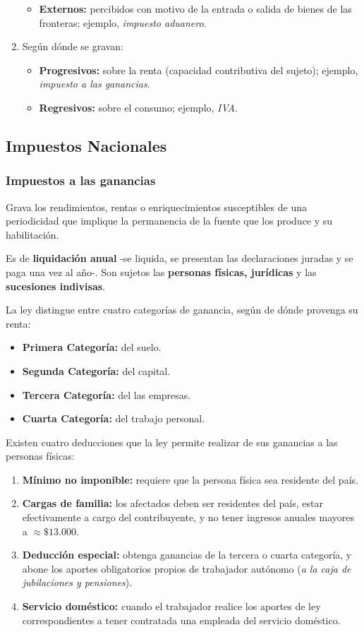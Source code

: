 \documentclass[10pt,a4paper]{article}
\begin{document}
\begin{enumerate}
\begin{itemize}
\item \textbf{Externos:} percibidos con motivo de la entrada o salida de bienes de las fronteras; ejemplo, \textit{impuesto aduanero}.
\end{itemize}
\item Según dónde se gravan:
\begin{itemize}
\item \textbf{Progresivos:} sobre la renta (capacidad contributiva del sujeto); ejemplo, \textit{impuesto a las ganancias}.
\item \textbf{Regresivos:} sobre el consumo; ejemplo, \textit{IVA}.
\end{itemize}
\end{enumerate}

\subsection{Impuestos Nacionales}

\subsubsection{Impuestos a las ganancias}

Grava los rendimientos, rentas o enriquecimientos susceptibles de una periodicidad que implique la permanencia de la fuente que los produce y su habilitación.

Es de \textbf{liquidación anual} -se liquida, se presentan las declaraciones juradas y se paga una vez al año-. Son sujetos las \textbf{personas físicas, jurídicas} y las \textbf{sucesiones indivisas}.

La ley distingue entre cuatro categorías de ganancia, según de dónde provenga su renta:
\begin{itemize}
\item \textbf{Primera Categoría:} del suelo.
\item \textbf{Segunda Categoría:} del capital.
\item \textbf{Tercera Categoría:} del las empresas.
\item \textbf{Cuarta Categoría:} del trabajo personal.
\end{itemize}

Existen cuatro deducciones que la ley permite realizar de sus ganancias a las personas físicas:
\begin{enumerate}
\item \textbf{Mínimo no imponible:} requiere que la persona física sea residente del país.
\item \textbf{Cargas de familia:} los afectados deben ser residentes del país, estar efectivamente a cargo del contribuyente, y no tener ingresos anuales mayores a $\approx \$13.000$.
\item \textbf{Deducción especial:} obtenga ganancias de la tercera o cuarta categoría, y abone los aportes obligatorios propios de trabajador autónomo (\textit{a la caja de jubilaciones y pensiones}).
\item \textbf{Servicio doméstico:} cuando el trabajador realice los aportes de ley correspondientes a tener contratada una empleada del servicio doméstico.
\end{enumerate}
\end{document}
